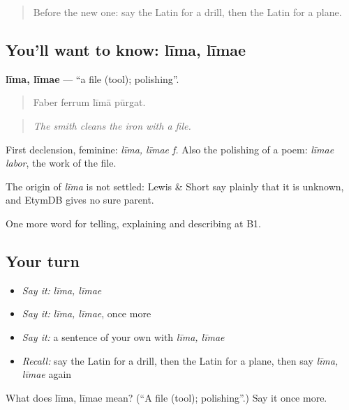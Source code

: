 \begin{quote}
Before the new one: say the Latin for a drill, then the Latin for a plane.
\end{quote}

\subsection*{You'll want to know: līma, līmae}
\textbf{līma, līmae} — \textquotedblleft{}a file (tool); polishing\textquotedblright{}.

\begin{quote}
Faber ferrum līmā pūrgat.
\end{quote}

\begin{quote}
\emph{The smith cleans the iron with a file.}
\end{quote}

First declension, feminine: \emph{līma, līmae f.} Also the polishing of a poem: \emph{līmae labor}, the work of the file.

\begin{cousinweb}
The origin of \emph{līma} is not settled: Lewis \& Short say plainly that it is unknown, and EtymDB gives no sure parent.
\end{cousinweb}

\begin{grammarlens}[title={What you've built}]
One more word for telling, explaining and describing at B1.
\end{grammarlens}

\subsection*{Your turn}
\begin{itemize}
\raggedright
  \item \emph{Say it:} \emph{līma, līmae}
  \item \emph{Say it:} \emph{līma, līmae}, once more
  \item \emph{Say it:} a sentence of your own with \emph{līma, līmae}
  \item \emph{Recall:} say the Latin for a drill, then the Latin for a plane, then say \emph{līma, līmae} again
\end{itemize}

\begin{tcolorbox}[breakable,colback=teal!4,colframe=teal!35!black,title={Before you move on}]
What does līma, līmae mean? (\textquotedblleft{}A file (tool); polishing\textquotedblright{}.) Say it once more.
\end{tcolorbox}
